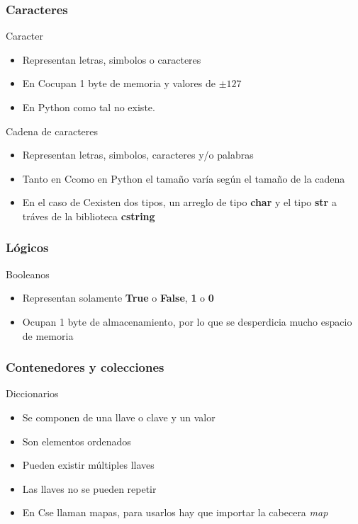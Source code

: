 \documentclass{beamer}
\newcommand{\Rplus}{\protect\hspace{-.1em}\protect\raisebox{.35ex}{\smaller{\smaller\textbf{+}}}}
\newcommand{\Cpp}{\mbox{C\Rplus\Rplus}\hspace{3pt}}
\begin{document}
\subsubsection{Caracteres}

\begin{frame}{Caracter}
    \begin{itemize}
        \item Representan letras, simbolos o caracteres
        \item En \Cpp  ocupan 1 byte de memoria y valores  de $\pm 127$ 
        \item En Python como tal no existe.
    \end{itemize}
\end{frame}

\begin{frame}{Cadena de caracteres}
    \begin{itemize}
        \item Representan letras, simbolos, caracteres y/o palabras
        \item Tanto en \Cpp como en Python el tamaño var\'ia seg\'un el tamaño de la cadena
        \item En el caso de \Cpp existen dos tipos, un arreglo de tipo \textbf{char} y el tipo \textbf{str} a tr\'aves de la biblioteca \textbf{cstring}
    \end{itemize}
\end{frame}

\subsubsection{Lógicos}

\begin{frame}{Booleanos}
    \begin{itemize}
        \item Representan solamente \textbf{True} o \textbf{False}, \textbf{1} o \textbf{0}
        \item Ocupan 1 byte de almacenamiento, por lo que se desperdicia mucho espacio de memoria
    \end{itemize}
\end{frame}


\subsubsection{Contenedores y colecciones}

\begin{frame}{Diccionarios}
    \begin{itemize}
        \item Se componen de una llave o clave y un valor
        \item Son elementos ordenados
        \item Pueden existir m\'ultiples llaves
        \item Las llaves no se pueden repetir
        \item En \Cpp se llaman mapas, para usarlos hay que importar la cabecera \textit{map}
    \end{itemize}
\end{frame}
\end{document}
